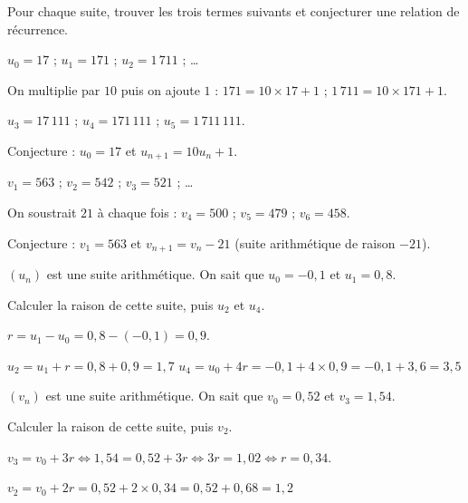 \documentclass[12pt,a4paper]{book}
\begin{document}
\exerciceDS{}

Pour chaque suite, trouver les trois termes suivants et conjecturer une relation de récurrence.
\begin{enumMet}
	\item $u_0=17$ ; $u_1=171$ ; $u_2=1\,711$ ; \dots

	\begin{corrBox}
		On multiplie par $10$ puis on ajoute $1$ : $171=10\times 17+1$ ; $1\,711=10\times 171+1$.

		$u_3=17\,111$ ; $u_4=171\,111$ ; $u_5=1\,711\,111$.

		Conjecture : $u_0=17$ et $u_{n+1}=10u_n+1$.
	\end{corrBox}
	\item $v_1=563$ ; $v_2=542$ ; $v_3=521$ ; \dots

	\begin{corrBox}
		On soustrait $21$ à chaque fois : $v_4=500$ ; $v_5=479$ ; $v_6=458$.

		Conjecture : $v_1=563$ et $v_{n+1}=v_n-21$ (suite arithmétique de raison $-21$).
	\end{corrBox}
\end{enumMet}


\exerciceDS{}

$(u_n)$ est une suite arithmétique. On sait que $u_0=-0,1$ et $u_1=0,8$.
\begin{itemMet}
	\item Calculer la raison de cette suite, puis $u_2$ et $u_4$.

	\begin{corrBox}
		$r=u_1-u_0=0,8-(-0,1)=0,9$.

		$u_2=u_1+r=0,8+0,9=1,7$ \qquad $u_4=u_0+4r=-0,1+4\times 0,9=-0,1+3,6=3,5$
	\end{corrBox}
\end{itemMet}

\exerciceDS{}

$(v_n)$ est une suite arithmétique. On sait que $v_0=0,52$ et $v_3=1,54$.
\begin{itemMet}
	\item Calculer la raison de cette suite, puis $v_2$.

	\begin{corrBox}
		$v_3=v_0+3r \iff 1,54=0,52+3r \iff 3r=1,02 \iff r=0,34$.

		$v_2=v_0+2r=0,52+2\times 0,34=0,52+0,68=1,2$
	\end{corrBox}
\end{itemMet}
\end{document}
